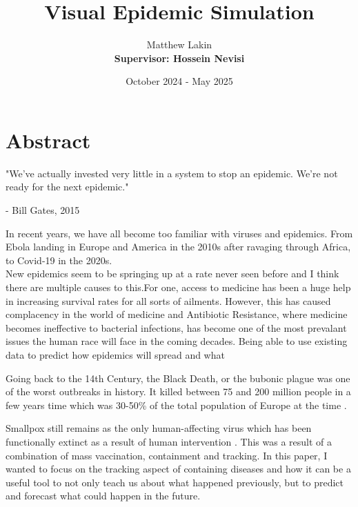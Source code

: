 \documentclass{report}
\title{Visual Epidemic Simulation}
\author{Matthew Lakin\\\textbf{Supervisor: Hossein Nevisi}}
\date{October 2024 - May 2025}
\begin{document}
\maketitle
\newpage

\tableofcontents


\newpage

\chapter{Abstract}
\begin{center}
    \LARGE{"We've actually invested very little in a system to stop an epidemic. We're not ready for the next epidemic."}
\end{center}
\begin{flushright}
    \large{- Bill Gates, 2015 \cite{gates:2015}}
\end{flushright}
\vspace{0.2cm}In recent years, we have all become too familiar with viruses and epidemics. From Ebola landing in Europe and America in the 2010s after ravaging through Africa, to Covid-19 in the 2020s.\\
New epidemics seem to be springing up at a rate never seen before \cite{morandFigure} and I think there are multiple causes to this.For one, access to medicine has been a huge help in increasing survival rates for all sorts of ailments. However, this has caused complacency in the world of medicine and Antibiotic Resistance, where medicine becomes ineffective to bacterial infections, has become one of the most prevalant issues the human race will face in the coming decades.
Being able to use existing data to predict how epidemics will spread and what


Going back to the 14th Century, the Black Death, or the bubonic plague was one of the worst outbreaks in history. It killed between 75 and 200 million people in a few years time which was 30-50\% of the total population of Europe at the time \cite{dewitte2008selectivity}. 


Smallpox still remains as the only human-affecting virus which has been functionally extinct as a result of human intervention \cite{cdc:smallpox}. This was a result of a combination of mass vaccination, containment and tracking.
In this paper, I wanted to focus on the tracking aspect of containing diseases and how it can be a useful tool to not only teach us about what happened previously, but to predict and forecast what could happen in the future.

\newpage
\end{document}
